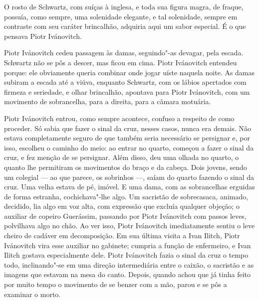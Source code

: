 O rosto de Schwartz, com suíças à inglesa, e toda sua figura magra, de
fraque, possuía, como sempre, uma solenidade elegante, e tal solenidade,
sempre em contraste com seu caráter brincalhão, adquiria aqui um sabor
especial. É o que pensava Piotr Ivánovitch.

Piotr Ivánovitch cedeu passagem às damas, seguindo"-as devagar, pela
escada. Schwartz não se pôs a descer, mas ficou em cima. Piotr
Ivánovitch entendeu porque: ele obviamente queria combinar onde jogar
uíste naquela noite. As damas subiram a escada até a viúva, enquanto
Schwartz, com os lábios apertados com firmeza e seriedade, e olhar
brincalhão, apontava para Piotr Ivánovitch, com um movimento de
sobrancelha, para a direita, para a câmara motuária.

Piotr Ivánovitch entrou, como sempre acontece, confuso a respeito de
como proceder. Só sabia que fazer o sinal da cruz, nesses casos, nunca
era demais. Não estava completamente seguro de que também seria
necessário se persignar e, por isso, escolheu o caminho do meio: ao
entrar no quarto, começou a fazer o sinal da cruz, e fez menção de se
persignar. Além disso, deu uma olhada no quarto, o quanto lhe permitiram
os movimentos do braço e da cabeça. Dois jovens, sendo um colegial --- ao
que parece, os sobrinhos ---, saíam do quarto fazendo o sinal da cruz. Uma
velha estava de pé, imóvel. E uma dama, com as sobrancelhas erguidas de
forma estranha, cochichava"-lhe algo. Um sacristão de sobrecasaca,
animado, decidido, lia algo em voz alta, com expressão que excluía
qualquer objeção; o auxiliar de copeiro Guerássim, passando por Piotr
Ivánovitch com passos leves, polvilhava algo no chão. Ao ver isso, Piotr
Ivánovitch imediatamente sentiu o leve cheiro de cadáver em
decomposição. Em sua última visita a Ivan Ilitch, Piotr Ivánovitch vira
esse auxiliar no gabinete; cumpria a função de enfermeiro, e Ivan Ilitch
gostava especialmente dele. Piotr Ivánovitch fazia o sinal da cruz o
tempo todo, inclinando"-se em uma direção intermediária entre o caixão, o
sacristão e as imagens que estavam na mesa do canto. Depois, quando
achou que já tinha feito por muito tempo o movimento de se benzer com a
mão, parou e se pôs a examinar o morto.

